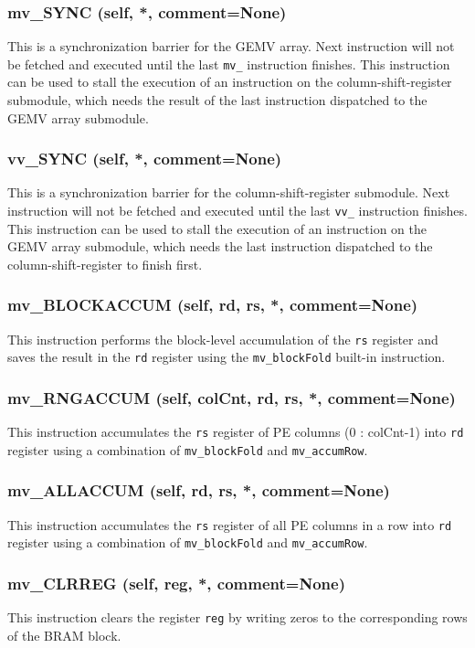 \documentclass{article}
\begin{document}
\subsubsection*{mv\_SYNC (self, *, comment=None)}
This is a synchronization barrier for the GEMV array.
Next instruction will not be fetched and executed until the last \texttt{mv\_}
instruction finishes.
This instruction can be used to stall the execution of an instruction on the
column-shift-register submodule, which needs the result of the last instruction
dispatched to the GEMV array submodule.


\subsubsection*{vv\_SYNC (self, *, comment=None)}
This is a synchronization barrier for the column-shift-register submodule.
Next instruction will not be fetched and executed until the last \texttt{vv\_}
instruction finishes.
This instruction can be used to stall the execution of an instruction on the
GEMV array submodule, which needs the last instruction dispatched to the
column-shift-register to finish first.


\subsubsection*{mv\_BLOCKACCUM (self, rd, rs, *, comment=None)}
This instruction performs the block-level accumulation of the \texttt{rs}
register and saves the result in the \texttt{rd} register using the
\texttt{mv\_blockFold} built-in instruction.


\subsubsection*{mv\_RNGACCUM (self, colCnt, rd, rs, *, comment=None)}
This instruction accumulates the \texttt{rs} register of PE columns (0 :
colCnt-1) into \texttt{rd} register using a combination of \texttt{mv\_blockFold}
and \texttt{mv\_accumRow}.


\subsubsection*{mv\_ALLACCUM (self, rd, rs, *, comment=None)}
This instruction accumulates the \texttt{rs} register of all PE columns in a
row into \texttt{rd} register using a combination of \texttt{mv\_blockFold} and
\texttt{mv\_accumRow}.


\subsubsection*{mv\_CLRREG (self, reg, *, comment=None)}
This instruction clears the register \texttt{reg} by writing zeros to the
corresponding rows of the BRAM block.
\end{document}
